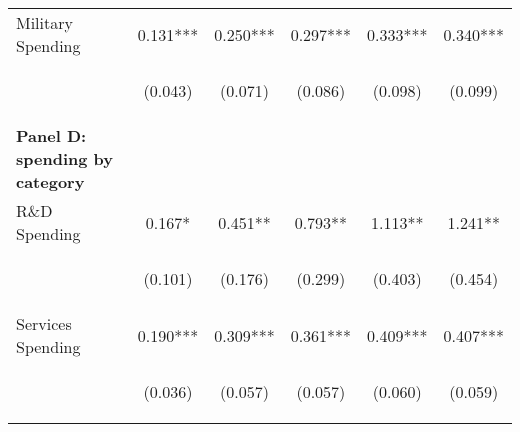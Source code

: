 \begin{tabular}{lccccc}
    Military Spending & 0.131*** &  0.250*** & 0.297*** & 0.333*** & 0.340*** \\
    & \begin{footnotesize}(0.043)\end{footnotesize} & \begin{footnotesize}(0.071)\end{footnotesize} & \begin{footnotesize}(0.086)\end{footnotesize} & \begin{footnotesize}(0.098)\end{footnotesize} & \begin{footnotesize}(0.099)\end{footnotesize} \\
    
     \multicolumn{1}{l}{\textbf{Panel D: spending by category}} & & & & \\
    R\&D Spending & 0.167* & 0.451** & 0.793** &  1.113** & 1.241**  \\
    \vspace{4pt} & \begin{footnotesize}(0.101)\end{footnotesize} & \begin{footnotesize}(0.176) \end{footnotesize} & \begin{footnotesize}(0.299)\end{footnotesize} & \begin{footnotesize}(0.403)\end{footnotesize} & \begin{footnotesize}(0.454)\end{footnotesize} \\
    
    Services Spending & 0.190*** &  0.309*** &  0.361*** & 0.409*** & 0.407*** \\
    \vspace{4pt} & \begin{footnotesize}(0.036)\end{footnotesize} & \begin{footnotesize} (0.057) \end{footnotesize} & \begin{footnotesize}(0.057) \end{footnotesize} & \begin{footnotesize}(0.060)\end{footnotesize} & \begin{footnotesize}(0.059)\end{footnotesize} \\
   


\end{tabular}
